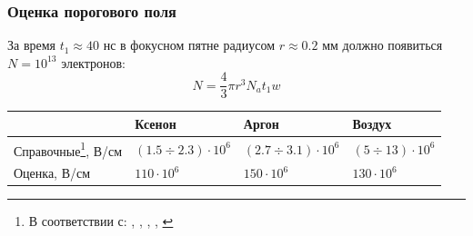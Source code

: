 \documentclass{beamer}
\begin{document}
	\begin{frame}
		\frametitle{Оценка порогового поля}
		
		За время $t_1 \approx 40 \text{ нс}$ в фокусном пятне радиусом $r \approx 0.2$ мм должно появиться $N = 10^{13}$ электронов:
		$$N = \frac{4}{3} \pi r^3 N_a t_1 w$$
		\begin{center}
		\end{center}
		
		\footnotesize
		\begin{table}[]
			\begin{tabular}{llll}
				\hline
				& Ксенон            & Аргон            & Воздух              \\ \hline
				Справочные\footnote{В соответствии с: \cite{raizer}, \cite{argon_threshold}, \cite{xenon_threshold}, \cite{air_breakdown}, \cite{air_threshold}}, В/см & $(1.5 \div 2.3) \cdot 10^6$ & $(2.7 \div 3.1) \cdot 10^6$ & $(5 \div 13) \cdot 10^6$ \\
				Оценка, В/см & $110 \cdot 10^6$ & $150 \cdot 10^6$ & $130 \cdot 10^6$ \\ \hline
			\end{tabular}
		\end{table}
	\end{frame}
	
\end{document}
